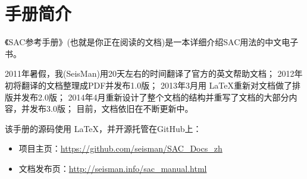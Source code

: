 \section{手册简介}
《SAC参考手册》(也就是你正在阅读的文档)是一本详细介绍SAC用法的中文电子书。

2011年暑假，我(SeisMan)用20天左右的时间翻译了官方的英文帮助文档；
2012年初将翻译的文档整理成PDF并发布1.0版；
2013年3月用 \LaTeX 重新对文档做了排版并发布2.0版；
2014年4月重新设计了整个文档的结构并重写了文档的大部分内容，并发布3.0版；
目前，文档依旧在不断更新中。

该手册的源码使用 \LaTeX ，并开源托管在GitHub上：
\begin{itemize}
\item 项目主页：\url{https://github.com/seisman/SAC_Docs_zh}
\item 文档发布页：\url{http://seisman.info/sac_manual.html}
\end{itemize}
